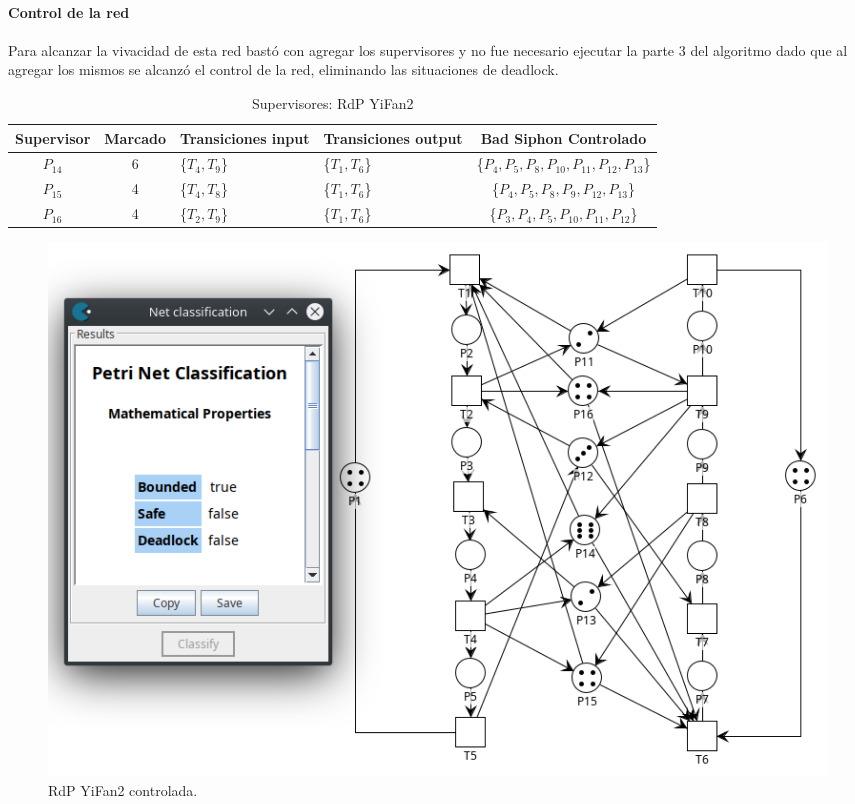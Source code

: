 \paragraph{Control de la red}
\hfill \break
Para alcanzar la vivacidad de esta red bastó con agregar los supervisores y no fue necesario ejecutar la parte 3 del algoritmo dado que al agregar los mismos se alcanzó el control de la red, eliminando las situaciones de deadlock.
\begin{table}[H]
    \small
    \centering
    \begin{tabular}{|c|c|P{2cm}|P{2.3cm}|c|}
    \hline
    \textbf{Supervisor} & \textbf{Marcado} & \textbf{Transiciones input} & \textbf{Transiciones output} & \textbf{Bad Siphon Controlado}  \\  \hline
    $P_{14}$ & 6 & \{$T_{4},T_{9}$\} & \{$T_{1},T_{6}$\} & \{$P_4, P_5, P_8, P_{10}, P_{11}, P_{12}, P_{13}$\} \\ 
    \hline
    $P_{15}$ & 4 & \{$T_{4}, T_{8}$\} & \{$T_1,T_6$\} & \{$P_4, P_5, P_{8}, P_{9}, P_{12}, P_{13}$\} \\ 
    \hline
    $P_{16}$ & 4 & \{$T_{2}, T_{9}$\} & \{$T_1,T_6$\} & \{$P_3, P_4, P_{5}, P_{10}, P_{11}, P_{12}$\} \\
    \hline
    \end{tabular}
    \caption{Supervisores: RdP YiFan2}
    \label{tab:Yifan2}
\end{table}
\hfill

\begin{figure}[H]
	\centering
	\includegraphics[width=\textwidth]{Figures/testing/yifan2_controlada.png}
	\caption[RdP YiFan2 controlada]{RdP YiFan2 controlada.}
	\label{fig:yifan2controlada}
 \end{figure}
 
